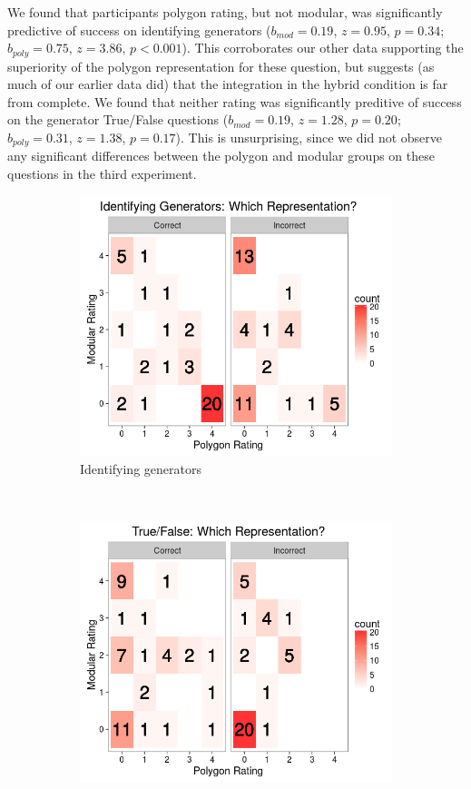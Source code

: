 \documentclass[man,10pt]{apa6}
\begin{document}
We found that participants polygon rating, but not modular, was significantly predictive of success on identifying generators ($b_{mod} = 0.19$, $z = 0.95$, $p = 0.34$; $b_{poly} = 0.75$, $z = 3.86$, $p < 0.001$). This corroborates our other data supporting the superiority of the polygon representation for these question, but suggests (as much of our earlier data did) that the integration in the hybrid condition is far from complete. We found that neither rating was significantly preditive of success on the generator True/False questions ($b_{mod} = 0.19$, $z = 1.28$, $p = 0.20$; $b_{poly} = 0.31$, $z = 1.38$, $p = 0.17$). This is unsurprising, since we did not observe any significant differences between the polygon and modular groups on these questions in the third experiment. 
\begin{figure}
\centering
\begin{subfigure}[c]{0.45\textwidth}
\centering 
\includegraphics[width=\textwidth]{figures/3/wr_genT.png}
\caption{Identifying generators}
\end{subfigure}
~
\begin{subfigure}[c]{0.45\textwidth}
\centering 
\includegraphics[width=\textwidth]{figures/3/wr_genTF.png}

\end{subfigure}
\end{figure}
\end{document}
